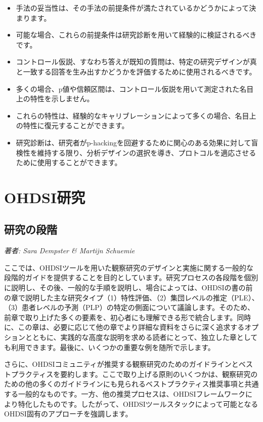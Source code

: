 \documentclass[
  11pt]{book}
\makeatletter
\providecommand{\tightlist}{%
  \setlength{\itemsep}{0pt}\setlength{\parskip}{0pt}}
\newenvironment{kframe}{%
\medskip{}
\setlength{\fboxsep}{.8em}
 \def\at@end@of@kframe{}%
 \ifinner\ifhmode%
  \def\at@end@of@kframe{\end{minipage}}%
  \begin{minipage}{\columnwidth}%
 \fi\fi%
 \def\FrameCommand##1{\hskip\@totalleftmargin \hskip-\fboxsep
 \colorbox{myShadeColor}{##1}\hskip-\fboxsep
     \hskip-\linewidth \hskip-\@totalleftmargin \hskip\columnwidth}%
 \MakeFramed {\advance\hsize-\width
   \@totalleftmargin\z@ \linewidth\hsize
   \@setminipage}}%
 {\par\unskip\endMakeFramed%
 \at@end@of@kframe}
\newenvironment{rmdblock}[1]
  {
  \begin{itemize}
  \renewcommand{\labelitemi}{
    \raisebox{-.7\height}[0pt][0pt]{
      {\setkeys{Gin}{width=3em,keepaspectratio}\texttt{[image: images/\#1]}}
    }
  }
  \setlength{\fboxsep}{1em}
  \begin{kframe}
  \item
  }
  {
  \end{kframe}
  \end{itemize}
  }
\newenvironment{rmdsummary}
  {\begin{rmdblock}{summary}}
  {\end{rmdblock}}
\theoremstyle{definition}
\theoremstyle{definition}
\theoremstyle{definition}
\theoremstyle{definition}
\theoremstyle{remark}
\makeatother
\begin{document}
\begin{rmdsummary}
\begin{itemize}
\tightlist
\item
  手法の妥当性は、その手法の前提条件が満たされているかどうかによって決まります。
\item
  可能な場合、これらの前提条件は研究診断を用いて経験的に検証されるべきです。
\item
  コントロール仮説、すなわち答えが既知の質問は、特定の研究デザインが真と一致する回答を生み出すかどうかを評価するために使用されるべきです。
\item
  多くの場合、p値や信頼区間は、コントロール仮説を用いて測定された名目上の特性を示しません。
\item
  これらの特性は、経験的なキャリブレーションによって多くの場合、名目上の特性に復元することができます。
\item
  研究診断は、研究者がp-hackingを回避するために関心のある効果に対して盲検性を維持する限り、分析デザインの選択を導き、プロトコルを適応させるために使用することができます。
\end{itemize}
\end{rmdsummary}

\part{OHDSI研究}\label{part-ohdsiux7814ux7a76}

\chapter{研究の段階}\label{StudySteps}

\emph{著者: Sara Dempster \& Martijn Schuemie}

ここでは、OHDSIツールを用いた観察研究のデザインと実施に関する一般的な段階的ガイドを提供することを目的としています。研究プロセスの各段階を個別に説明し、その後、一般的な手順を説明し、場合によっては、OHDSIの書の前の章で説明した主な研究タイプ（1）特性評価、（2）集団レベルの推定（PLE）、（3）患者レベルの予測（PLP）の特定の側面について議論します。そのため、前章で取り上げた多くの要素を、初心者にも理解できる形で統合します。同時に、この章は、必要に応じて他の章でより詳細な資料をさらに深く追求するオプションとともに、実践的な高度な説明を求める読者にとって、独立した章としても利用できます。最後に、いくつかの重要な例を随所で示します。

さらに、OHDSIコミュニティが推奨する観察研究のためのガイドラインとベストプラクティスを要約します。ここで取り上げる原則のいくつかは、観察研究のための他の多くのガイドラインにも見られるベストプラクティス推奨事項と共通する一般的なものです。一方、他の推奨プロセスは、OHDSIフレームワークにより特化したものです。したがって、OHDSIツールスタックによって可能となるOHDSI固有のアプローチを強調します。
\end{document}
